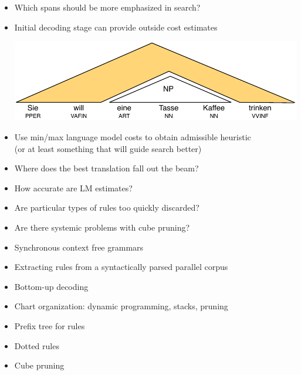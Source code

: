 \documentclass[landscape]{slides}
\begin{document}

\begin{itemize}
\item Which spans should be more emphasized in search?
\item Initial decoding stage can provide outside cost estimates
\begin{center} \vspace{10mm}
\includegraphics[scale=1]{tree-outside-cost.pdf}\\[10mm]
\end{center}
\item Use min/max language model costs to obtain admissible heuristic\\
(or at least something that will guide search better)
\end{itemize}



\begin{itemize} \vspace{30mm}\itemsep 5mm
\item Where does the best translation fall out the beam?
\item How accurate are LM estimates?
\item Are particular types of rules too quickly discarded?
\item Are there systemic problems with cube pruning?
\end{itemize}


\begin{itemize}
\item Synchronous context free grammars
\item Extracting rules from a syntactically parsed parallel corpus
\item Bottom-up decoding
\item Chart organization: dynamic programming, stacks, pruning
\item Prefix tree for rules
\item Dotted rules
\item Cube pruning
\end{itemize}

\end{document}
